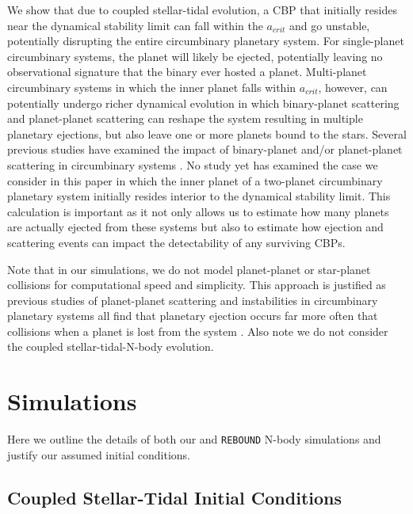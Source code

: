 We show that due to coupled stellar-tidal evolution, a CBP that initially resides near the dynamical stability limit can fall within the $a_{crit}$ and go unstable, potentially disrupting the entire circumbinary planetary system.  For single-planet circumbinary systems, the planet will likely be ejected, potentially leaving no observational signature that the binary ever hosted a planet.  Multi-planet circumbinary systems in which the inner planet falls within $a_{crit}$, however, can potentially undergo richer dynamical evolution in which binary-planet scattering and planet-planet scattering can reshape the system resulting in multiple planetary ejections, but also leave one or more planets bound to the stars.  Several previous studies have examined the impact of binary-planet and/or planet-planet scattering in circumbinary systems \citep[e.g.][]{Kratter2014,Smullen2016,Sutherland2016,Gong2017,Gong2017b}.  No study yet has examined the case we consider in this paper in which the inner planet of a two-planet circumbinary planetary system initially resides interior to the dynamical stability limit.  This calculation is important as it not only allows us to estimate how many planets are actually ejected from these systems but also to estimate how ejection and scattering events can impact the detectability of any surviving CBPs.

Note that in our simulations, we do not model planet-planet or star-planet collisions for computational speed and simplicity.  This approach is justified as previous studies of planet-planet scattering and instabilities in circumbinary planetary systems all find that planetary ejection occurs far more often that collisions when a planet is lost from the system \citep[see][]{Smullen2016,Sutherland2016}.  Also note we do not consider the coupled stellar-tidal-N-body evolution.


\section{Simulations} \label{sec:simulations}

Here we outline the details of both our \vplanet and \texttt{REBOUND} N-body simulations and justify our assumed initial conditions.

\subsection{Coupled Stellar-Tidal Initial Conditions} \label{sec:initial_conditions}

